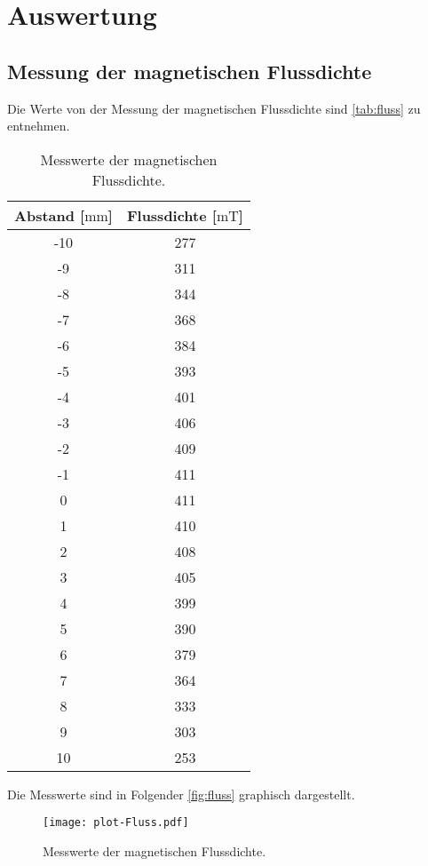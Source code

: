 \section{Auswertung}
\label{sec:Auswertung}


\subsection{Messung der magnetischen Flussdichte}
\label{subsec:Flussdichte}

Die Werte von der Messung der magnetischen Flussdichte sind \autoref{tab:fluss} zu entnehmen.


\begin{table}[H]
  \caption{Messwerte der magnetischen Flussdichte.}
  \label{tab:fluss}
  \centering
  \begin{tabular}{c c}
      \toprule
      Abstand [$\si{\milli\metre}$] & Flussdichte [$\si{\milli\tesla}$]\\
      \midrule
      -10 & 277 \\
      -9 & 311 \\
      -8 & 344 \\
      -7 & 368 \\
      -6 & 384 \\
      -5 & 393 \\
      -4 & 401 \\
      -3 & 406 \\
      -2 & 409 \\
      -1 & 411 \\
      0 & 411 \\
      1 & 410 \\
      2 & 408 \\
      3 & 405 \\
      4 & 399 \\
      5 & 390 \\
      6 & 379 \\
      7 & 364 \\
      8 & 333 \\
      9 & 303 \\
      10 & 253 \\
      \bottomrule
    \end{tabular}
\end{table}

\noindent
Die Messwerte sind in Folgender \autoref{fig:fluss} graphisch dargestellt.

\begin{figure}[H]
  \centering
  \texttt{[image: plot-Fluss.pdf]}
  \caption{Messwerte der magnetischen Flussdichte.}
  \label{fig:fluss}
\end{figure}

